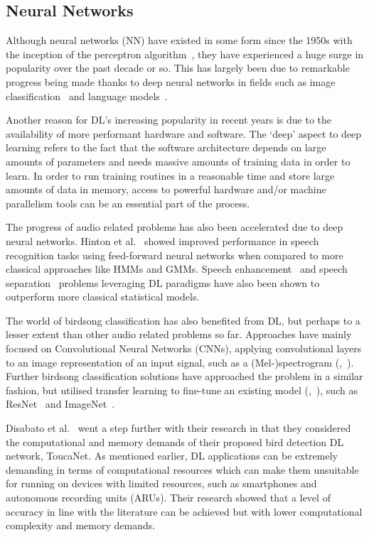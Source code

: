 \subsection{Neural Networks}\label{ssec:nn}

Although neural networks (NN) have existed in some form since the 1950s with the
inception of the perceptron algorithm~\cite{rosenblatt1958perceptron}, they have
experienced a huge surge in popularity over the past decade or so. This has
largely been due to remarkable progress being made thanks to deep neural
networks in fields such as image classification~\cite{krizhevsky2012imagenet}
and language models~\cite{mikolov2010recurrent}.

Another reason for DL's increasing popularity in recent years is due
to the availability of more performant hardware and software. The `deep' aspect
to deep learning refers to the fact that the software architecture depends on
large amounts of parameters and needs massive amounts of training data in order
to learn. In order to run training routines in a reasonable time and store large
amounts of data in memory, access to powerful hardware and/or machine
parallelism tools can be an essential part of the process.

The progress of audio related problems has also been accelerated due to deep
neural networks. Hinton et al.~\cite{hinton2012deep} showed improved performance
in speech recognition tasks using feed-forward neural networks when compared to
more classical approaches like HMMs and GMMs. Speech
enhancement~\cite{afouras2018conversation} and speech
separation~\cite{ephrat2018looking} problems leveraging DL paradigms
have also been shown to outperform more classical statistical models.

The world of birdsong classification has also benefited from DL, but
perhaps to a lesser extent than other audio related problems so far. Approaches
have mainly focused on Convolutional Neural Networks (CNNs), applying
convolutional layers to an image representation of an input signal, such as a
(Mel-)spectrogram (\cite{berger2018bird},~\cite{mukherjee2018convolutional}).
Further birdsong classification solutions have approached the problem in a
similar fashion, but utilised transfer learning to fine-tune an existing model
(\cite{disabato2021birdsong},~\cite{lasseck2018acoustic}), such as
ResNet~\cite{he2016deep} and ImageNet~\cite{deng2009imagenet}.

Disabato et al.~\cite{disabato2021birdsong} went a step further with their
research in that they considered the computational and memory demands of their
proposed bird detection DL network, ToucaNet. As mentioned earlier, DL
applications can be extremely demanding in terms of computational resources
which can make them unsuitable for running on devices with limited resources,
such as smartphones and autonomous recording units (ARUs). Their research showed
that a level of accuracy in line with the literature can be achieved but with
lower computational complexity and memory demands.

